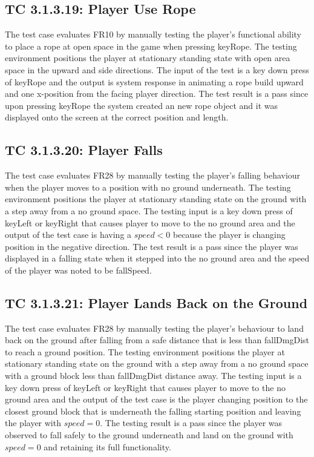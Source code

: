 \documentclass[12pt, titlepage]{article}
\begin{document}
\subsection*{TC 3.1.3.19: Player Use Rope}
The test case evaluates FR10 by manually testing the player's functional ability to place a rope at open space in the game when pressing keyRope. The testing environment positions the player at stationary standing state with open area space in the upward and side directions. The input of the test is a key down press of keyRope and the output is system response in animating a rope build upward and one x-position from the facing player direction. The test result is a pass since upon pressing keyRope the system created an new rope object and it was displayed onto the screen at the correct position and length. 

\subsection*{TC 3.1.3.20: Player Falls}
The test case evaluates FR28 by manually testing the player's falling behaviour when the player moves to a position with no ground underneath. The testing environment positions the player at stationary standing state on the ground with a step away from a no ground space. The testing input is a key down press of keyLeft or keyRight that causes player to move to the no ground area and the output of the test case is having a $speed<0$ because the player is changing position in the negative direction. The test result is a pass since the player was displayed in a falling state when it stepped into the no ground area and the speed of the player was noted to be fallSpeed.

\subsection*{TC 3.1.3.21: Player Lands Back on the Ground}
The test case evaluates FR28 by manually testing the player's behaviour to land back on the ground after falling from a safe distance that is less than fallDmgDist to reach a ground position. The testing environment positions the player at stationary standing state on the ground with a step away from a no ground space with a ground block less than fallDmgDist distance away. The testing input is a key down press of keyLeft or keyRight that causes player to move to the no ground area and the output of the test case is the player changing position to the closest ground block that is underneath the falling starting position and leaving the player with $speed=0$. The testing result is a pass since the player was observed to fall safely to the ground underneath and land on the ground with $speed=0$ and retaining its full functionality. 
\end{document}
